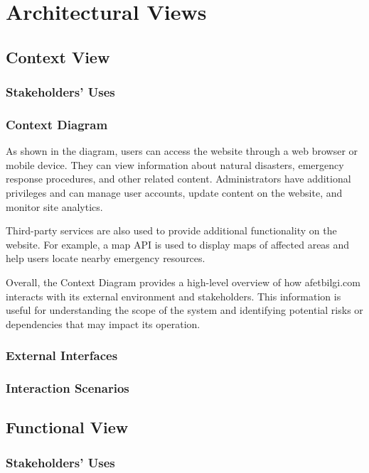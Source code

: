\documentclass[a4paper]{article}
\begin{document}
    \section{Architectural Views}
    \subsection{Context View}
    \subsubsection{Stakeholders' Uses}
    \lipsum[1-1]
    \subsubsection{Context Diagram}
    

        As shown in the diagram, users can access the website through a web browser or mobile device. They can view information about
        natural disasters, emergency response procedures, and other related content. Administrators have additional privileges and can
        manage user accounts, update content on the website, and monitor site analytics.

        Third-party services are also used to provide additional functionality on the website. For example, a map API is used to
        display maps of affected areas and help users locate nearby emergency resources.

        Overall, the Context Diagram provides a high-level overview of how afetbilgi.com interacts with its external environment and
        stakeholders. This information is useful for understanding the scope of the system and identifying potential risks or
        dependencies that may impact its operation.

    \subsubsection{External Interfaces}
    \lipsum[1-1]
    \subsubsection{Interaction Scenarios}
    \lipsum[1-1]
    \subsection{Functional View}
    \subsubsection{Stakeholders' Uses}
    \lipsum[1-1]
\end{document}
